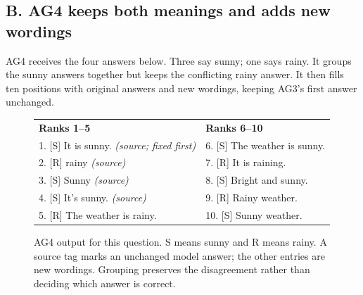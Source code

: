 \documentclass[11pt,letterpaper]{article}
\begin{document}
\subsection*{B. AG4 keeps both meanings and adds new wordings}
AG4 receives the four answers below. Three say sunny; one says rainy. It groups the sunny answers together but keeps the conflicting rainy answer. It then fills ten positions with original answers and new wordings, keeping AG3's first answer unchanged.
\begin{figure}[H]\centering
{}
\vspace{-3pt}
{\small\begin{tabularx}{\linewidth}{@{}YY@{}}
\textbf{Ranks 1--5} & \textbf{Ranks 6--10}\\[3pt]
1. \textcolor{decisiongreen}{[S]} It is sunny. \textit{(source; fixed first)} & 6. \textcolor{decisiongreen}{[S]} The weather is sunny.\\
2. \textcolor{reviewamber}{[R]} rainy \textit{(source)} & 7. \textcolor{reviewamber}{[R]} It is raining.\\
3. \textcolor{decisiongreen}{[S]} Sunny \textit{(source)} & 8. \textcolor{decisiongreen}{[S]} Bright and sunny.\\
4. \textcolor{decisiongreen}{[S]} It's sunny. \textit{(source)} & 9. \textcolor{reviewamber}{[R]} Rainy weather.\\
5. \textcolor{reviewamber}{[R]} The weather is rainy. & 10. \textcolor{decisiongreen}{[S]} Sunny weather.\\
\end{tabularx}}
\caption{AG4 output for this question. S means sunny and R means rainy. A source tag marks an unchanged model answer; the other entries are new wordings. Grouping preserves the disagreement rather than deciding which answer is correct.}\label{fig:shared}
\end{figure}
\end{document}
